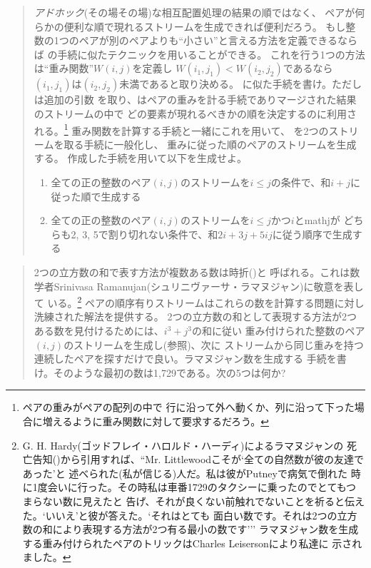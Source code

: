 \begin{quote}
\emph{アドホック}(その場その場)な相互配置処理の結果の順ではなく、
ペアが何らかの便利な順で現れるストリームを生成できれば便利だろう。
もし整数の1つのペアが別のペアよりも``小さい''と言える方法を定義できるならば
の手続に似たテクニックを用いることができる。
これを行う1つの方法は``重み関数''\( W(i, j) \)を定義し
\( W(i_1, j_1) < W(i_2, j_2) \)であるなら
\( (i_1, j_1) \)は\( (i_2, j_2) \)未満であると取り決める。
に似た手続を書け。ただしは追加の引数
を取り、はペアの重みを計る手続でありマージされた結果のストリームの中で
どの要素が現れるべきかの順を決定するのに利用される。\footnote{ペアの重みがペアの配列の中で
行に沿って外へ動くか、列に沿って下った場合に増えるように重み関数に対して要求するだろう。}
重み関数を計算する手続と一緒にこれを用いて、
を2つのストリームを取る手続に一般化し、
重みに従った順のペアのストリームを生成する。
作成した手続を用いて以下を生成せよ。

\begin{enumerate}[a]

\item
全ての正の整数のペア\( (i, j) \)のストリームを\( i \le j \)の条件で、和\( i + j \)に
従った順で生成する

\item
全ての正の整数のペア\( (i, j) \)のストリームを\( i \le j \)かつ\( i \)とmath{j}が
どちらも2, 3, 5で割り切れない条件で、和\( 2i + 3j + 5i\!j \)に従う順序で生成する

\end{enumerate}
\end{quote}

\begin{quote}
2つの立方数の和で表す方法が複数ある数は時折()と
呼ばれる。これは数学者Srinivasa Ramanujan(シュリニヴァーサ・ラマヌジャン)に敬意を表して
いる。\footnote{G. H. Hardy(ゴッドフレイ・ハロルド・ハーディ)によるラマヌジャンの
死亡告知()から引用すれば、``Mr. Littlewoodこそが`全ての自然数が彼の友達であった'と
述べられた(私が信じる)人だ。私は彼がPutneyで病気で倒れた
時に1度会いに行った。その時私は車番1729のタクシーに乗ったのでとてもつまらない数に見えたと
告げ、それが良くない前触れでないことを祈ると伝えた。`いいえ'と彼が答えた。`それはとても
面白い数です。それは2つの立方数の和により表現する方法が2つ有る最小の数です'''
ラマヌジャン数を生成する重み付けられたペアのトリックはCharles Leisersonにより私達に
示されました。}
ペアの順序有りストリームはこれらの数を計算する問題に対し洗練された解法を提供する。
2つの立方数の和として表現する方法が2つある数を見付けるためには、\( i^3 + j^3 \)の和に従い
重み付けられた整数のペア\( (i, j) \)のストリームを生成し(参照)、次に
ストリームから同じ重みを持つ連続したペアを探すだけで良い。ラマヌジャン数を生成する
手続を書け。そのような最初の数は1,729である。次の5つは何か?
\end{quote}

